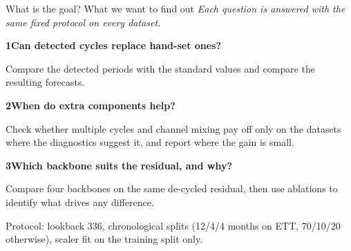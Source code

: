 \documentclass[aspectratio=169]{beamer}
\begin{document}
\begin{frame}{What is the goal? What we want to find out}
\normalsize
{\small\textit{Each question is answered with the same fixed protocol on every dataset.}}\par
\vspace{0.8em}
\textcolor{accent}{\textbf{1}}\quad \textbf{Can detected cycles replace hand-set ones?}
\par\vspace{0.3em}
{\small Compare the detected periods with the standard values and compare the resulting forecasts.}

\vspace{0.5em}
\textcolor{accent}{\textbf{2}}\quad \textbf{When do extra components help?}
\par\vspace{0.3em}
{\small Check whether multiple cycles and channel mixing pay off only on the datasets where the diagnostics suggest it, and report where the gain is small.}

\vspace{0.5em}
\textcolor{accent}{\textbf{3}}\quad \textbf{Which backbone suits the residual, and why?}
\par\vspace{0.3em}
{\small Compare four backbones on the same de-cycled residual, then use ablations to identify what drives any difference.}

\vspace{0.4em}
{\footnotesize\textcolor{muted}{Protocol: lookback 336, chronological splits (12/4/4 months on ETT, 70/10/20 otherwise), scaler fit on the training split only.}}
\end{frame}

\end{document}
